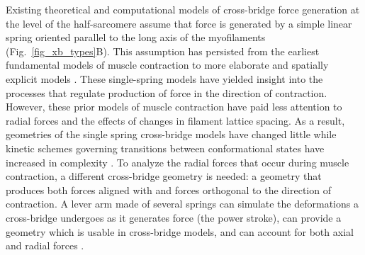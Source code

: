\documentclass[10pt]{article}
\newcommand{\citep}[1]{\cite{#1}} %
\begin{document}
Existing theoretical and computational models of cross-bridge force generation at the level of the half-sarcomere assume that force is generated by a simple linear spring oriented parallel to the long axis of the myofilaments (Fig.~\ref{fig_xb_types}B). 
This assumption has persisted from the earliest fundamental models of muscle contraction to more elaborate and spatially explicit models \citep{Huxley1957, Daniel1998, Chase2004, Tanner2007, Campbell2009}.  
These single-spring models have yielded insight into the processes that regulate production of force in the direction of contraction.
However, these prior models of muscle contraction have paid less attention to radial forces and the effects of changes in filament lattice spacing. 
As a result, geometries of the single spring cross-bridge models have changed little while kinetic schemes governing transitions between conformational states have increased in complexity \citep{Huxley1957, Pate1989, Daniel1998, Smith2008a}. 
To analyze the radial forces that occur during muscle contraction, a different cross-bridge geometry is needed: a geometry that produces both forces aligned with and forces orthogonal to the direction of contraction. 
A lever arm made of several springs can simulate the deformations a cross-bridge undergoes as it generates force (the power stroke), can provide a geometry which is usable in cross-bridge models, and can account for both axial and radial forces \citep{Houdusse2001}.  
\end{document}
